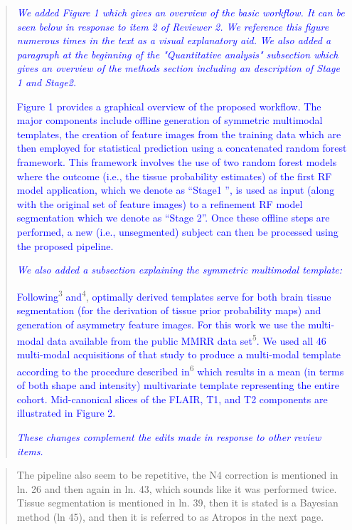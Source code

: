 \documentclass[12pt,]{article}
\begin{document}
\begin{quote}
\emph{\textcolor{blue}{We added Figure 1 which gives an overview of the basic workflow.
  It can be seen below in response to item 2 of Reviewer 2.  We reference
  this figure numerous times in the text as a visual explanatory aid.}}
\emph{\textcolor{blue}{We also added a paragraph at the beginning of the "Quantitative analysis" subsection
  which gives an overview of the methods section including an description of Stage 1 and Stage2.}}

\textcolor{blue}{Figure 1 provides a graphical overview of the proposed workflow.  The major components
include offline generation of symmetric multimodal templates, the creation of
feature images from the training data which are then employed for statistical
prediction using a concatenated random forest framework.  This framework involves
the use of two random forest models where the outcome (i.e., the tissue
probability estimates) of the first RF model application,
which we denote as ``Stage1 '', is used as input (along with the original set of
feature images) to a refinement RF model segmentation which we denote as ``Stage 2''.
Once these offline steps
are performed, a new (i.e., unsegmented) subject can then be processed using the proposed pipeline.}

\emph{\textcolor{blue}{We also added a subsection explaining the symmetric multimodal template:}}

\textcolor{blue}{Following}\textsuperscript{3}
\textcolor{blue}{and}\textsuperscript{4},
\textcolor{blue}{optimally derived templates
serve for both brain tissue segmentation (for the derivation of tissue prior probability maps) and generation of asymmetry feature images.
For this work we use the multi-modal data available from the public MMRR data set}\textsuperscript{5}\textcolor{blue}{.  We used all 46 multi-modal acquisitions of that study to produce a multi-modal template according to the procedure described in}\textsuperscript{6}
\textcolor{blue}{which
results in a mean (in terms of both shape and intensity) multivariate template representing the entire cohort.  Mid-canonical slices of the FLAIR, T1, and T2 components are illustrated in Figure 2.}

\emph{\textcolor{blue}{These changes complement the edits made in response to other review items.}}
\end{quote}

\begin{quote}
The pipeline also seem to be repetitive, the N4 correction is mentioned
in ln. 26 and then again in ln. 43, which sounds like it was performed
twice. Tissue segmentation is mentioned in ln. 39, then it is stated is
a Bayesian method (ln 45), and then it is referred to as Atropos in the
next page.
\end{quote}
\end{document}
